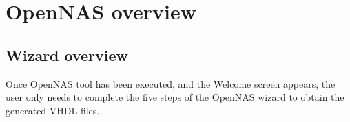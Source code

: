 






\newpage

\section{OpenNAS overview}
\label{sec:Overview}

\subsection{Wizard overview}

Once OpenNAS tool has been executed, and the Welcome screen appears, the user only needs to complete the five steps of the OpenNAS wizard to obtain the generated VHDL files.

